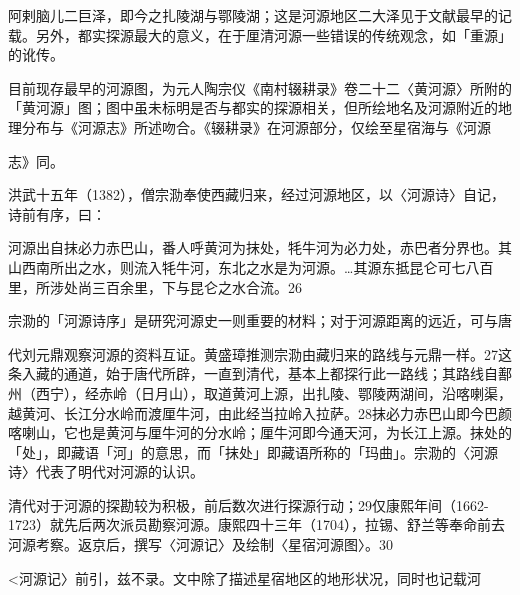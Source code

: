 阿剌脑儿二巨泽，即今之扎陵湖与鄂陵湖；这是河源地区二大泽见于文献最早的记载。另外，都实探源最大的意义，在于厘清河源一些错误的传统观念，如「重源」的讹传。

目前现存最早的河源图，为元人陶宗仪《南村辍耕录》卷二十二〈黄河源〉所附的「黄河源」图；图中虽未标明是否与都实的探源相关，但所绘地名及河源附近的地理分布与《河源志》所述吻合。《辍耕录》在河源部分，仅绘至星宿海与《河源


\noindent 志》同。


洪武十五年（1382），僧宗泐奉使西藏归来，经过河源地区，以〈河源诗〉自记，诗前有序，曰：

\begin{BookQuote}
河源出自抹必力赤巴山，番人呼黄河为抹处，牦牛河为必力处，赤巴者分界也。其山西南所出之水，则流入牦牛河，东北之水是为河源。…其源东抵昆仑可七八百里，所涉处尚三百余里，下与昆仑之水合流。26
\end{BookQuote}

宗泐的「河源诗序」是研究河源史一则重要的材料；对于河源距离的远近，可与唐

\vfill
\begin{BookNotes}
\end{BookNotes}


\noindent 代刘元鼎观察河源的资料互证。黄盛璋推测宗泐由藏归来的路线与元鼎一样。27这条入藏的通道，始于唐代所辟，一直到清代，基本上都探行此一路线；其路线自鄯州（西宁），经赤岭（日月山），取道黄河上源，出扎陵、鄂陵两湖间，沿喀喇渠，越黄河、长江分水岭而渡厘牛河，由此经当拉岭入拉萨。28抹必力赤巴山即今巴颜喀喇山，它也是黄河与厘牛河的分水岭；厘牛河即今通天河，为长江上源。抹处的「处」，即藏语「河」的意思，而「抹处」即藏语所称的「玛曲」。宗泐的〈河源诗〉代表了明代对河源的认识。

清代对于河源的探勘较为积极，前后数次进行探源行动；29仅康熙年间（1662-1723）就先后两次派员勘察河源。康熙四十三年（1704），拉锡、舒兰等奉命前去河源考察。返京后，撰写〈河源记〉及绘制〈星宿河源图〉。30

\begin{BookQuote}
<河源记〉前引，兹不录。文中除了描述星宿地区的地形状况，同时也记载河
\end{BookQuote}

